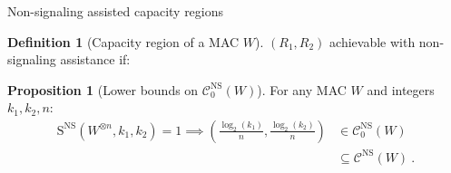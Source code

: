 \documentclass{beamer}
\theoremstyle{definition}
\newtheorem{prop}[theo]{Proposition}
\newtheorem{defi}[theo]{Definition}
\theoremstyle{remark}
\DeclareMathOperator{\maxi}{\text{maximize}}
\DeclareMathOperator{\st}{\text{subject to}}
\DeclarePairedDelimiter\ceil{\lceil}{\rceil}
\begin{document}

\begin{frame}{Non-signaling assisted capacity regions}
    \begin{defi}[Capacity region  of a MAC $W$]
  \label{defi:capacity}
  $(R_1,R_2)$ achievable with non-signaling assistance if:
    \end{defi}
    \pause
    \pause
    \begin{prop}[Lower bounds on $\mathcal{C}^{\mathrm{NS}}_0(W)$]
      For any MAC $W$ and integers $k_1,k_2,n$:
      \begin{equation*}
        \begin{aligned}
          \mathrm{S}^{\mathrm{NS}}(W^{\otimes n},k_1,k_2) = 1 \implies \left(\frac{\log_2(k_1)}{n},\frac{\log_2(k_2)}{n}\right) &\in \mathcal{C}^{\mathrm{NS}}_0(W)\\
          &\subseteq \mathcal{C}^{\mathrm{NS}} (W) \ .
        \end{aligned}
      \end{equation*}
    \end{prop}
\end{frame}
\end{document}
